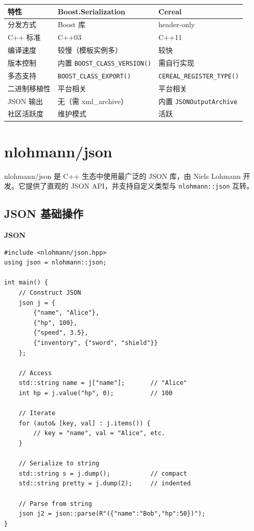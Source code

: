 \documentclass[12pt,a4paper,fontset=fandol]{ctexbook}
\newcommand{\Fn}[1]{\texttt{#1()}}
\newcommand{\Tp}[1]{\texttt{#1}}
\newcommand{\jsonlabel}{%
  \noindent\begin{tcolorbox}[colback=jsonheadbg,coltext=white,
    sharp corners,boxrule=0pt,width=3.2em,height=1.4em,
    halign=center,valign=center,nobeforeafter,left=0pt,right=0pt,
    top=0pt,bottom=0pt]\small\bfseries JSON\end{tcolorbox}}
\begin{document}
\begin{compare}[title={Boost.Serialization vs Cereal}]
\begin{tabularx}{\textwidth}{lXX}
\toprule
\textbf{特性} & \textbf{Boost.Serialization} & \textbf{Cereal} \\
\midrule
分发方式 & Boost 库 & header-only \\
C++ 标准 & C++03 & C++11 \\
编译速度 & 较慢（模板实例多） & 较快 \\
版本控制 & 内置 \Fn{BOOST\_CLASS\_VERSION} & 需自行实现 \\
多态支持 & \Fn{BOOST\_CLASS\_EXPORT} & \Fn{CEREAL\_REGISTER\_TYPE} \\
二进制移植性 & 平台相关 & 平台相关 \\
JSON 输出 & 无（需 xml\_archive） & 内置 \Tp{JSONOutputArchive} \\
社区活跃度 & 维护模式 & 活跃 \\
\bottomrule
\end{tabularx}
\end{compare}

\chapter{nlohmann/json}\label{ch:nlohmann}

nlohmann/json 是 C++ 生态中使用最广泛的 JSON 库，由 Niels Lohmann 开发。它提供了直观的 JSON API，并支持自定义类型与 \Tp{nlohmann::json} 互转。

\section{JSON 基础操作}\label{sec:json-basic}

\jsonlabel
\begin{lstlisting}[caption={nlohmann/json: 基础 JSON 操作}]
#include <nlohmann/json.hpp>
using json = nlohmann::json;

int main() {
    // Construct JSON
    json j = {
        {"name", "Alice"},
        {"hp", 100},
        {"speed", 3.5},
        {"inventory", {"sword", "shield"}}
    };

    // Access
    std::string name = j["name"];       // "Alice"
    int hp = j.value("hp", 0);          // 100

    // Iterate
    for (auto& [key, val] : j.items()) {
        // key = "name", val = "Alice", etc.
    }

    // Serialize to string
    std::string s = j.dump();           // compact
    std::string pretty = j.dump(2);     // indented

    // Parse from string
    json j2 = json::parse(R"({"name":"Bob","hp":50})");
}
\end{lstlisting}
\end{document}
